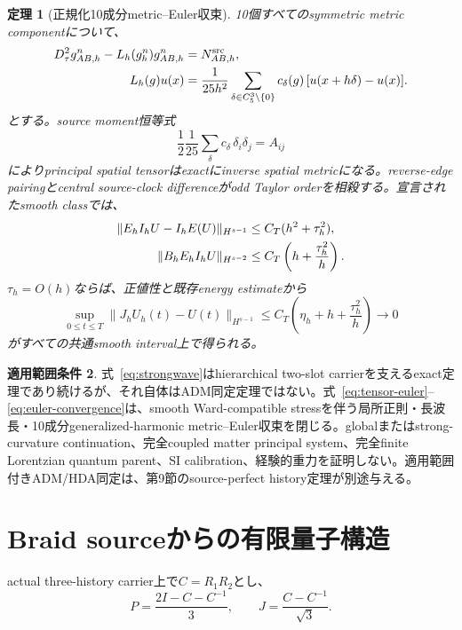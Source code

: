 \documentclass[11pt]{article}
\newtheorem{theorem}{定理}[section]
\theoremstyle{definition}
\newtheorem{scope}[theorem]{適用範囲条件}
\theoremstyle{remark}
\begin{document}
\begin{theorem}[正規化10成分metric--Euler収束]
10個すべてのsymmetric metric componentについて、
\begin{align}
D_\tau^2 g_{AB,h}^n-L_h(g_h^n)g_{AB,h}^n
&=N^{\rm src}_{AB,h},\notag\\
L_h(g)u(x)
&=\frac1{25h^2}
\sum_{\delta\in C_5^3\setminus\{0\}}
c_\delta(g)\,[u(x+h\delta)-u(x)].
\label{eq:tensor-euler}
\end{align}
とする。source moment恒等式
\begin{equation}
\frac12\frac1{25}\sum_\delta c_\delta\,\delta_i\delta_j=A_{ij}
\end{equation}
によりprincipal spatial tensorはexactにinverse spatial metricになる。reverse-edge pairingとcentral source-clock differenceがodd Taylor orderを相殺する。宣言されたsmooth classでは、
\begin{align}
\|E_hI_hU-I_hE(U)\|_{H^{s-1}}
&\le C_T(h^2+\tau_h^2),\notag\\
\|B_hE_hI_hU\|_{H^{s-2}}
&\le C_T\left(h+\frac{\tau_h^2}{h}\right).
\label{eq:euler-residuals}
\end{align}
$\tau_h=O(h)$ならば、正値性と既存energy estimateから
\begin{equation}
\sup_{0\le t\le T}
\|J_hU_h(t)-U(t)\|_{H^{s-1}}
\le C_T\left(\eta_h+h+\frac{\tau_h^2}{h}\right)
\longrightarrow0
\label{eq:euler-convergence}
\end{equation}
がすべての共通smooth interval上で得られる。
\end{theorem}

\begin{scope}
式~\eqref{eq:strongwave}はhierarchical two-slot carrierを支えるexact定理であり続けるが、それ自体はADM同定定理ではない。式~\eqref{eq:tensor-euler}--\eqref{eq:euler-convergence}は、smooth Ward-compatible stressを伴う局所正則・長波長・10成分generalized-harmonic metric--Euler収束を閉じる。globalまたはstrong-curvature continuation、完全coupled matter principal system、完全finite Lorentzian quantum parent、SI calibration、経験的重力を証明しない。適用範囲付きADM/HDA同定は、第9節のsource-perfect history定理が別途与える。
\end{scope}

\section{Braid sourceからの有限量子構造}

actual three-history carrier上で$C=R_1R_2$とし、
\begin{equation}
P=\frac{2I-C-C^{-1}}3,
\qquad
J=\frac{C-C^{-1}}{\sqrt3}.
\label{eq:complexstructure}
\end{equation}
\end{document}
